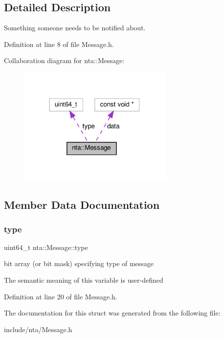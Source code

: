 \subsection{Detailed Description}
Something someone needs to be notified about. 

Definition at line 8 of file Message.\+h.



Collaboration diagram for nta\+:\+:Message\+:
\nopagebreak
\begin{figure}[H]
\begin{center}
\leavevmode
\includegraphics[width=218pt]{d3/dbb/structnta_1_1Message__coll__graph}
\end{center}
\end{figure}


\subsection{Member Data Documentation}
\mbox{\label{structnta_1_1Message_a512ef14eaa86f830247f8194cbbd4f83}} 
\subsubsection{\texorpdfstring{type}{type}}
{\footnotesize\ttfamily uint64\+\_\+t nta\+::\+Message\+::type}

bit array (or bit mask) specifying type of message

The semantic meaning of this variable is user-\/defined 

Definition at line 20 of file Message.\+h.



The documentation for this struct was generated from the following file\+:\begin{DoxyCompactItemize}
\item 
include/nta/Message.\+h\end{DoxyCompactItemize}
